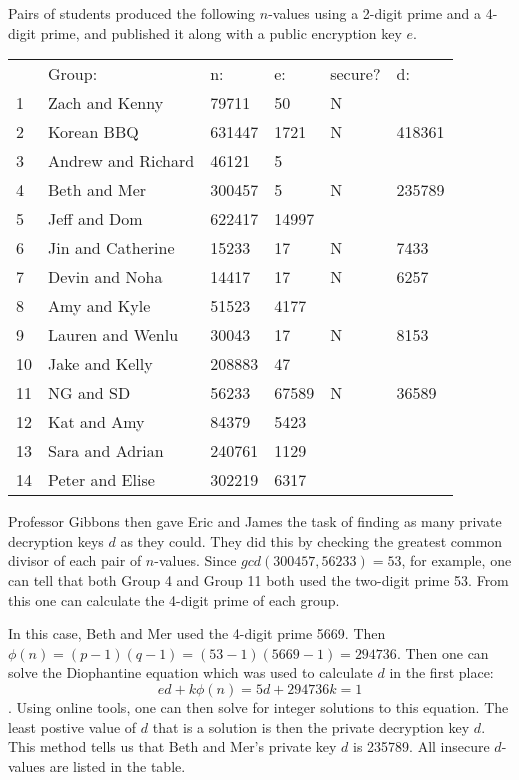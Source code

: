 \begin{example}
Pairs of students produced the following $n$-values using a 2-digit prime and a 4-digit prime, and published it along with a public encryption key $e$.

\begin{table}[h]
\begin{tabular}{llllll}
   & Group:             & n:     & e:    & secure? & d:     \\
1  & Zach and Kenny     & 79711  & 50    & N       &        \\
2  & Korean BBQ         & 631447 & 1721  & N       & 418361 \\
3  & Andrew and Richard & 46121  & 5     &         &        \\
4  & Beth and Mer       & 300457 & 5     & N       & 235789 \\
5  & Jeff and Dom       & 622417 & 14997 &         &        \\
6  & Jin and Catherine  & 15233  & 17    & N       & 7433   \\
7  & Devin and Noha     & 14417  & 17    & N       & 6257   \\
8  & Amy and Kyle       & 51523  & 4177  &         &        \\
9  & Lauren and Wenlu   & 30043  & 17    & N       & 8153   \\
10 & Jake and Kelly     & 208883 & 47    &         &        \\
11 & NG and SD          & 56233  & 67589 & N       & 36589  \\
12 & Kat and Amy        & 84379  & 5423  &         &        \\
13 & Sara and Adrian    & 240761 & 1129  &         &        \\
14 & Peter and Elise    & 302219 & 6317  &         &       
\end{tabular}
\end{table}

Professor Gibbons then gave Eric and James the task of finding as many private decryption keys $d$ as they could. They did this by checking the greatest common divisor of each pair of $n$-values. Since $gcd(300457, 56233)=53$, for example, one can tell that both Group 4 and Group 11 both used the two-digit prime 53. From this one can calculate the 4-digit prime of each group.

In this case, Beth and Mer used the 4-digit prime 5669. Then $\phi(n)=(p-1)(q-1)=(53-1)(5669-1)=294736$. Then one can solve the Diophantine equation which was used to calculate $d$ in the first place: $$ed+k\phi(n)=5d+294736k=1$$. Using online tools, one can then solve for integer solutions to this equation. The least postive value of $d$ that is a solution is then the private decryption key $d$. This method tells us that Beth and Mer's private key $d$ is 235789. All insecure $d$-values are listed in the table.


\end{example}
